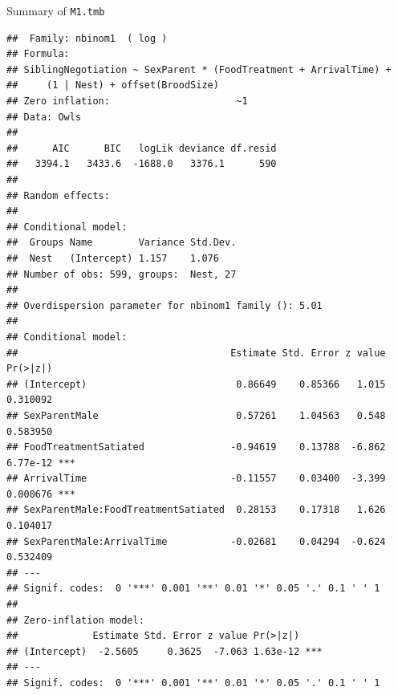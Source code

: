 \documentclass[
  ignorenonframetext,
]{beamer}
\begin{document}
\begin{frame}[fragile]{Summary of \texttt{M1.tmb}}
\protect\hypertarget{summary-of-m1.tmb}{}
\tiny

\begin{verbatim}
##  Family: nbinom1  ( log )
## Formula:          
## SiblingNegotiation ~ SexParent * (FoodTreatment + ArrivalTime) +  
##     (1 | Nest) + offset(BroodSize)
## Zero inflation:                      ~1
## Data: Owls
## 
##      AIC      BIC   logLik deviance df.resid 
##   3394.1   3433.6  -1688.0   3376.1      590 
## 
## Random effects:
## 
## Conditional model:
##  Groups Name        Variance Std.Dev.
##  Nest   (Intercept) 1.157    1.076   
## Number of obs: 599, groups:  Nest, 27
## 
## Overdispersion parameter for nbinom1 family (): 5.01 
## 
## Conditional model:
##                                     Estimate Std. Error z value Pr(>|z|)    
## (Intercept)                          0.86649    0.85366   1.015 0.310092    
## SexParentMale                        0.57261    1.04563   0.548 0.583950    
## FoodTreatmentSatiated               -0.94619    0.13788  -6.862 6.77e-12 ***
## ArrivalTime                         -0.11557    0.03400  -3.399 0.000676 ***
## SexParentMale:FoodTreatmentSatiated  0.28153    0.17318   1.626 0.104017    
## SexParentMale:ArrivalTime           -0.02681    0.04294  -0.624 0.532409    
## ---
## Signif. codes:  0 '***' 0.001 '**' 0.01 '*' 0.05 '.' 0.1 ' ' 1
## 
## Zero-inflation model:
##             Estimate Std. Error z value Pr(>|z|)    
## (Intercept)  -2.5605     0.3625  -7.063 1.63e-12 ***
## ---
## Signif. codes:  0 '***' 0.001 '**' 0.01 '*' 0.05 '.' 0.1 ' ' 1
\end{verbatim}
\end{frame}
\end{document}
